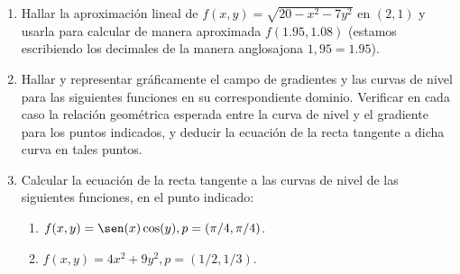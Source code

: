 \documentclass[11pt]{book}
\theoremstyle{definicion}
\theoremstyle{teorema}
\theoremstyle{ejemplo}
\begin{document}
\begin{enumerate}


\item Hallar la aproximaci\'{o}n lineal de $f(x,y)=\sqrt{20-x^{2}-7y^{2}}$ en $
\left( 2,1\right) $ y usarla para calcular de manera aproximada $f(1{.}95,1{.}08)$ (estamos escribiendo los decimales de la manera anglosajona $1,95=1{.}95$).

\item Hallar y representar gráficamente el campo de gradientes y las curvas de nivel para las siguientes funciones en su correspondiente dominio. Verificar en cada caso la relación geométrica esperada entre la curva de nivel y el gradiente para los puntos indicados, y deducir la ecuación de la recta tangente a dicha curva en tales puntos.




  \item Calcular la ecuación de la recta tangente a las curvas de nivel de las siguientes funciones, en el punto indicado:
    \begin{enumerate}
    \item $f(x,y)=\sen(x)\cos(y), p=(\pi/4,\pi/4)$.
      \item $f(x,y)=4x^2+9y^2, p=(1/2,1/3)$.
      \end{enumerate}


\end{enumerate}
\end{document}
